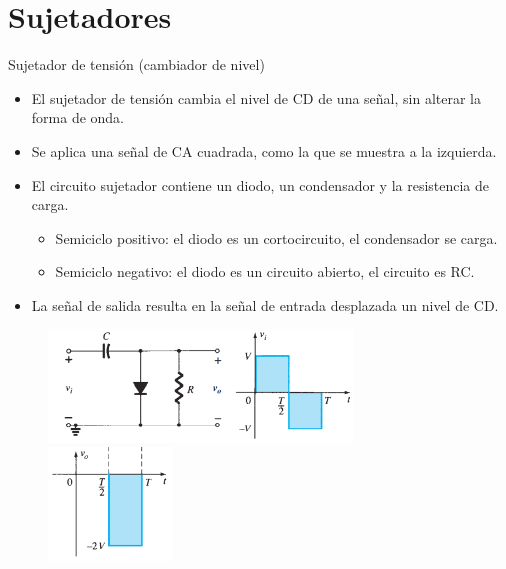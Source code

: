 \documentclass[t,aspectratio=169]{beamer}
\begin{document}
\section{Sujetadores}

\begin{frame}{Sujetador de tensión (cambiador de nivel)}

\begin{itemize}
    \item El sujetador de tensión cambia el nivel de CD de una señal, sin alterar la forma de onda.
    \item Se aplica una señal de CA cuadrada, como la que se muestra a la izquierda.
    \item El circuito sujetador contiene un diodo, un condensador y la resistencia de carga.
    \begin{itemize}
        \item Semiciclo positivo: el diodo es un cortocircuito, el condensador se carga.
        \item Semiciclo negativo: el diodo es un circuito abierto, el circuito es RC.
    \end{itemize}
    \item La señal de salida resulta en la señal de entrada desplazada un nivel de CD.
\end{itemize}

\begin{figure}
    \centering
    \includegraphics[height=3cm]{figures/sujetador_circuito.png}\hspace{1cm}\includegraphics[height=3cm]{figures/sujetador_1.png}\hspace{1cm}\includegraphics[height=3cm]{figures/sujetador_2.png}
\end{figure}

\end{frame}
\end{document}
